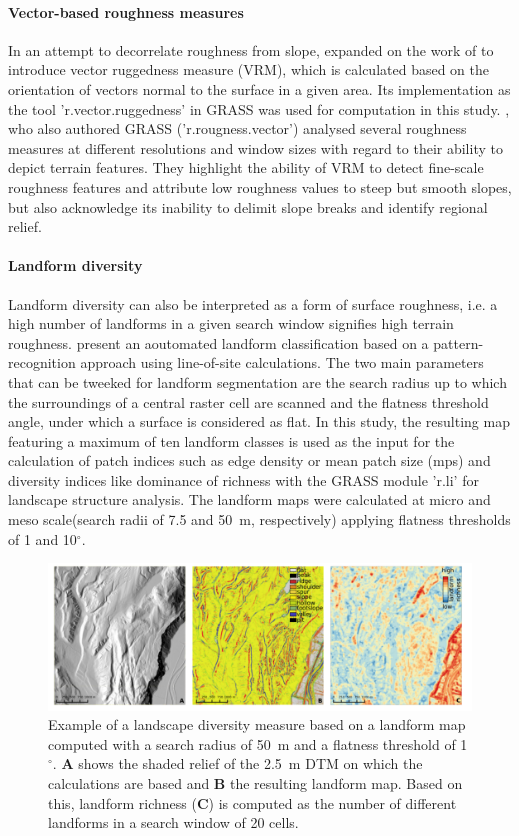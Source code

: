 \documentclass[preprint,12pt,authoryear]{elsarticle}
\begin{document}
\paragraph{Vector-based roughness measures}
 In an attempt to decorrelate roughness from slope, \cite{Sappington2007} expanded on the work of \cite{Hobson1972} to introduce vector ruggedness measure (VRM), which is calculated based on the orientation of vectors normal to the surface in a given area. Its implementation as the tool 'r.vector.ruggedness' in GRASS was used for computation in this study.  \cite{Grohmann2010}, who also authored GRASS ('r.rougness.vector') analysed several roughness measures at different resolutions and window sizes with regard to their ability to depict terrain features. They highlight the ability of VRM to detect fine-scale roughness features and attribute low roughness values to steep but smooth slopes, but also acknowledge its inability to delimit slope breaks and identify regional relief.

\paragraph{Landform diversity} 

Landform diversity can also be interpreted as a form of surface roughness, i.e. a high number of landforms in a given search window signifies high terrain roughness. \citep{Jasiewicz2013} present an aoutomated landform classification based on a pattern-recognition approach using  line-of-site calculations. The two main parameters that can be tweeked for landform segmentation are the search radius up to which the surroundings of a central raster cell are scanned and the flatness threshold angle, under which a surface is considered as flat. In this study, the resulting map featuring a maximum of ten landform classes is used as the input for the calculation of patch indices such as edge density or mean patch size (mps) and diversity indices like dominance of richness with the GRASS module 'r.li' for landscape structure analysis. The landform maps were calculated at micro and meso scale(search radii of 7.5 and 50~m, respectively) applying flatness thresholds of 1 and 10$^{\circ}$.
 \begin{figure}[ht!]
\includegraphics[width=\textwidth,angle=0]{diversity_100pi.pdf}
\caption{Example of a landscape diversity measure based on a landform map computed with a search radius of 50~m and a flatness threshold of 1$^{\circ}$. \textbf{A} shows the shaded relief of the 2.5~m DTM on which the calculations are based and \textbf{B} the resulting landform map. Based on this, landform richness (\textbf{C}) is computed as the number of different landforms in a search window of 20 cells.}
\label{fig:richness}
\end{figure}
\end{document}
